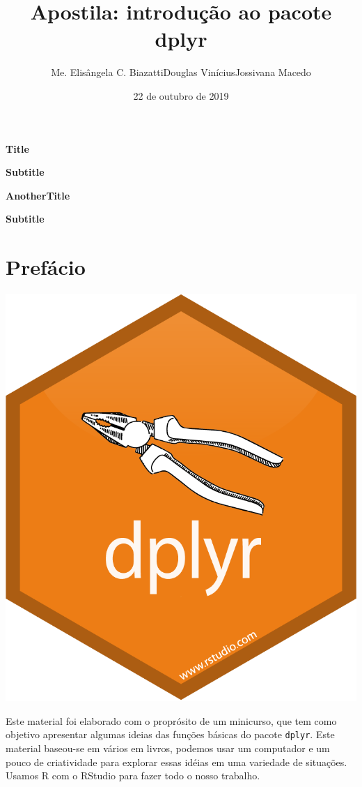 \documentclass[]{book}
\title{Apostila: introdução ao pacote dplyr}
\author{Me. Elisângela C. BiazattiDouglas ViníciusJossivana Macedo}
\date{22 de outubro de 2019}
\begin{document}
\maketitle

{
\pagestyle{empty}
\begin{titlepage}
   \begin{center}

       \Huge

       \textbf{Title}

       \vspace{0.5cm}

       \LARGE
       \textbf{Subtitle}

   \end{center}
\end{titlepage}

\begin{titlepage}
   \begin{center}

       \Huge

       \textbf{AnotherTitle}

       \vspace{0.5cm}

       \LARGE
       \textbf{Subtitle}

   \end{center}
\end{titlepage}
}

{
\setcounter{tocdepth}{1}
\tableofcontents
}
\hypertarget{prefacio}{%
\chapter{Prefácio}\label{prefacio}}

\begin{center}\includegraphics[width=0.3\linewidth]{imagens/dplyr} \end{center}

Este material foi elaborado com o proprósito de um minicurso, que tem como objetivo apresentar algumas ideias das funções básicas do pacote \texttt{dplyr}. Este material baseou-se em vários em livros, podemos usar um computador e um pouco de criatividade para explorar essas idéias em uma variedade de situações. Usamos R com o RStudio para fazer todo o nosso trabalho.
\end{document}
